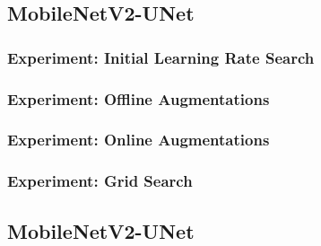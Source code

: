 \subsection{MobileNetV2-UNet}

\subsubsection{Experiment: Initial Learning Rate Search}

\subsubsection{Experiment: Offline Augmentations}

\subsubsection{Experiment: Online Augmentations}

\subsubsection{Experiment: Grid Search}

\subsection{MobileNetV2-UNet}
